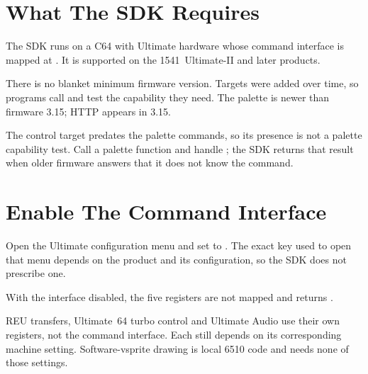 

\section{What The SDK Requires}

The SDK runs on a C64 with Ultimate hardware whose command interface is mapped
at . It is supported on the 1541~Ultimate-II and later
products.

There is no blanket minimum firmware version. Targets were added over time, so
programs call  and test the capability they need. The
palette is newer than firmware 3.15; HTTP appears in 3.15.

The control target predates the palette commands, so its presence is not a
palette capability test. Call a palette function and handle
; the SDK returns that result when older
firmware answers that it does not know the command.


\section{Enable The Command Interface}

Open the Ultimate configuration menu and set  to
. The exact key used to open that menu depends on the product and
its configuration, so the SDK does not prescribe one.

With the interface disabled, the five registers are not mapped and
 returns .

REU transfers, Ultimate~64 turbo control and Ultimate Audio use their own
registers, not the command interface. Each still depends on its corresponding
machine setting. Software-vsprite drawing is local 6510 code and needs none of
those settings.


